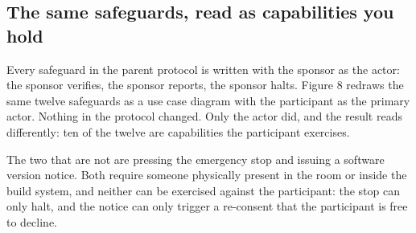 \vspace{-0.7cm}

\subsection{The same safeguards, read as capabilities you hold}

Every safeguard in the parent protocol is written with the sponsor as the actor:
the sponsor verifies, the sponsor reports, the sponsor halts. Figure 8 redraws
the same twelve safeguards as a use case diagram with the participant as the
primary actor. Nothing in the protocol changed. Only the actor did, and the
result reads differently: ten of the twelve are capabilities the participant
exercises.

The two that are not are pressing the emergency stop and issuing a software
version notice. Both require someone physically present in the room or inside
the build system, and neither can be exercised against the participant: the stop
can only halt, and the notice can only trigger a re-consent that the participant
is free to decline.

